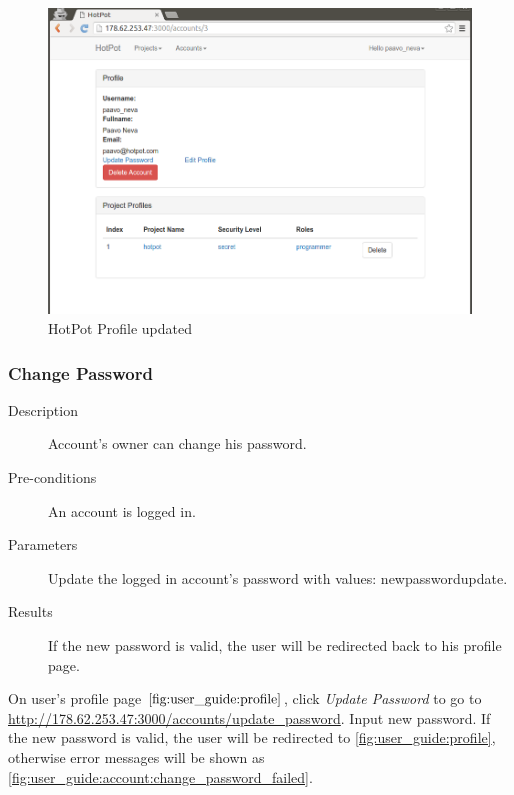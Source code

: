 \begin{figure}[bth]                                                                                                                                                  \myfloatalign
\includegraphics[width=1.0\linewidth]{gfx/chapter_5/account/profile_updated}
\caption[HotPot Profile updated]{HotPot Profile updated}
\label{fig:user_guide:account:profile_updated}
\end{figure}

\subsubsection{Change Password}
\label{ch:result:user_guide:account:change_password}

\begin{description}
\item[Description] Account's owner can change his password.
\item[Pre-conditions] An account is logged in.
\item[Parameters] Update the logged in account's password with values: {newpasswordupdate}.
\item[Results] If the new password is valid, the user will be redirected back to his profile page.
\end{description}

On user's profile page \(\autoref{fig:user_guide:profile}\), click \emph{Update Password} to go to \href{http://178.62.253.47:3000/accounts/update\_password}{http://178.62.253.47:3000/accounts/update\_password}.
Input new password.
If the new password is valid, the user will be redirected to \autoref{fig:user_guide:profile}, otherwise error messages will be shown as \autoref{fig:user_guide:account:change_password_failed}.


